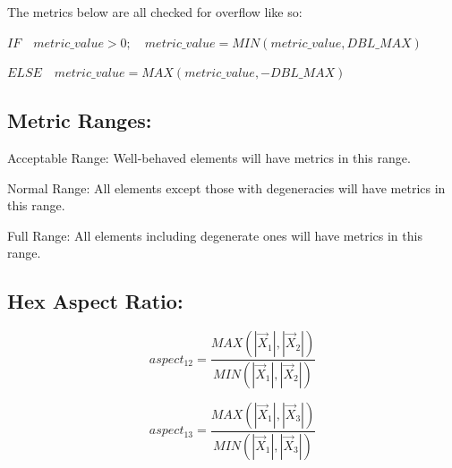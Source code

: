 \documentclass[12pt]{article}
\begin{document}
\begin{flushleft}
The metrics below are all checked for overflow like so:
\end{flushleft}

\begin{flushleft}
\quad ${IF \quad metric\_value > 0;  \quad metric\_value = MIN( metric\_value, DBL\_MAX )}$
\end{flushleft}
 
\begin{flushleft}
\quad ${ELSE \quad metric\_value = MAX( metric\_value, -DBL\_MAX )}$
\end{flushleft}
 
\subsection*{Metric Ranges:}

\begin{flushleft}
Acceptable Range: Well-behaved elements will have metrics in this range.
\end{flushleft}
\begin{flushleft}
Normal Range:     All elements except those with degeneracies will have  \newline
                  metrics in this range.
\end{flushleft}
\begin{flushleft}
Full Range:       All elements including degenerate ones will have metrics \newline
                  in this range. 
\end{flushleft}

\subsection*{Hex Aspect Ratio:}

\begin{displaymath}
aspect_{12} = \frac{ MAX \left( \left| \vec X_1 \right|,  \left| \vec X_2 \right|  \right) } 
                    { MIN \left( \left| \vec X_1 \right|,  \left| \vec X_2 \right|  \right) }
\end{displaymath}

\begin{displaymath}
aspect_{13} = \frac{ MAX \left( \left| \vec X_1 \right|,  \left| \vec X_3 \right|  \right) } 
                    { MIN \left( \left| \vec X_1 \right|,  \left| \vec X_3 \right|  \right) } 
\end{displaymath}
\end{document}
